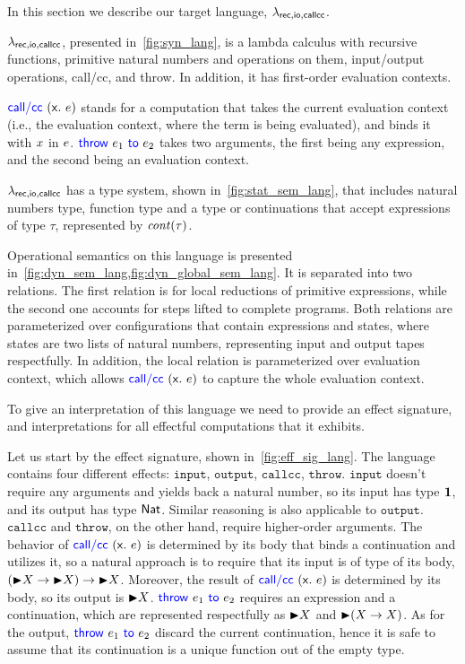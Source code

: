 In this section we describe our target language, $\lambda_{\mathsf{rec},\mathsf{io,callcc}}$.

$\lambda_{\mathsf{rec},\mathsf{io,callcc}}$, presented in~\cref{fig:syn_lang}, is a lambda calculus
with recursive functions, primitive natural numbers and operations on
them, input/output operations, call/cc, and throw. In addition, it has
first-order evaluation contexts.

$\mathsf{\color{blue} call/cc}~({\mathsf{{x}}}{\mathsf{.}}~{e})$ stands for a computation that takes the current
evaluation context (i.e., the evaluation context, where the term is
being evaluated), and binds it with $x$ in $e$.
$\mathsf{\color{blue} throw}~{e_1}~\mathsf{\color{blue} to}~{e_2}$ takes two arguments, the first being any
expression, and the second being an evaluation context.

$\lambda_{\mathsf{rec},\mathsf{io,callcc}}$ has a type system, shown in~\cref{fig:stat_sem_lang}, that
includes natural numbers type, function type and a type or
continuations that accept expressions of type $\tau$, represented by
$\mathit{cont}({\tau})$.

Operational semantics on this language is presented
in~\cref{fig:dyn_sem_lang,fig:dyn_global_sem_lang}. It is separated
into two relations. The first relation is for local reductions of
primitive expressions, while the second one accounts for steps lifted
to complete programs. Both relations are parameterized over
configurations that contain expressions and states, where states are
two lists of natural numbers, representing input and output tapes
respectfully. In addition, the local relation is parameterized over
evaluation context, which allows $\mathsf{\color{blue} call/cc}~({\mathsf{{x}}}{\mathsf{.}}~{e})$ to capture the
whole evaluation context.

To give an interpretation of this language we need to provide an
effect signature, and interpretations for all effectful computations
that it exhibits.

Let us start by the effect signature, shown
in~\cref{fig:eff_sig_lang}. The language contains four different
effects: $\mathtt{input}$, $\mathtt{output}$, $\mathtt{callcc}$,
$\mathtt{throw}$. $\mathtt{input}$ doesn't require any arguments and
yields back a natural number, so its input has type $\mathbf{1}$, and its
output has type $\mathsf{Nat}$. Similar reasoning is also applicable to
$\mathtt{output}$. $\mathtt{callcc}$ and $\mathtt{throw}$, on the
other hand, require higher-order arguments. The behavior of
$\mathsf{\color{blue} call/cc}~({\mathsf{{x}}}{\mathsf{.}}~{e})$ is determined by its body that binds a
continuation and utilizes it, so a natural approach is to require
that its input is of type of its body, $(\mathord{\blacktriangleright} X \rightarrow \mathord{\blacktriangleright}
X) \rightarrow \mathord{\blacktriangleright} X$. Moreover, the result of
$\mathsf{\color{blue} call/cc}~({\mathsf{{x}}}{\mathsf{.}}~{e})$ is determined by its body, so its output is
$\mathord{\blacktriangleright} X$. $\mathsf{\color{blue} throw}~{e_1}~\mathsf{\color{blue} to}~{e_2}$ requires an expression and a
continuation, which are represented respectfully as $\mathord{\blacktriangleright} X$ and
$\mathord{\blacktriangleright} (X \rightarrow X)$. As for the output,
$\mathsf{\color{blue} throw}~{e_1}~\mathsf{\color{blue} to}~{e_2}$ discard the current continuation, hence it
is safe to assume that its continuation is a unique function out of
the empty type.

